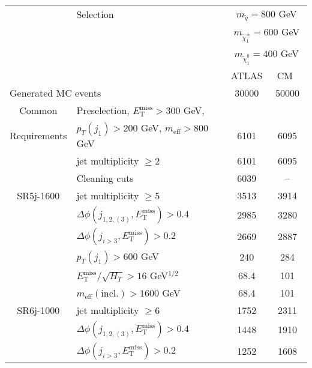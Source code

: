 \documentclass[10pt,fleqn]{article}
\newcommand{\met}{E^\mathrm{miss}_\mathrm{T}}
\newcommand{\meff}{m_\mathrm{eff}}
\begin{document}
\thispagestyle{empty}
\begin{table}[H] \centering
 \renewcommand*{\arraystretch}{1.}
 \begin{tabular}{c|l|c|c} \toprule
      & Selection & \multicolumn{2}{c}{$m_{\tilde{q}} = 800$ GeV}       \\ 
      &           & \multicolumn{2}{c}{$m_{\tilde{\chi}^\pm_1} = 600$ GeV}    \\      
      &           & \multicolumn{2}{c}{$m_{\tilde{\chi}^0_1} = 400$ GeV}   \\ \midrule
      &           & ATLAS             &  ~CM~~                         \\ \midrule
\multicolumn{2}{l|}{Generated MC events}                       &   30000    &   50000        \\ \midrule   
Common       & Preselection, $\met > 300$ GeV,                 &            &                \\ 
Requirements & $p_T(j_1) > 200$ GeV, $\meff > 800$ GeV         &     6101   &   6095         \\
             & jet multiplicity $\geq 2$                       &     6101   &   6095         \\
             & Cleaning cuts                                   &     6039   &   --           \\ \midrule      
SR5j-1600    & jet multiplicity $\geq 5$                       &     3513   &   3914         \\
             & $\Delta\phi(j_{1,2,(3)},\met) > 0.4$            &     2985   &   3280          \\
             & $\Delta\phi(j_{i>3},\met) > 0.2$                &     2669   &   2887          \\      
             & $p_T(j_1) > 600$ GeV                            &      240   &   284         \\           
             & $\met/\sqrt{H_T} > 16$ GeV$^{1/2}$              &     68.4   &   101         \\    
             & $\meff(\mathrm{incl.}) > 1600$ GeV              &     68.4   &   101         \\ \midrule       
SR6j-1000    & jet multiplicity $\geq 6$                       &     1752   &   2311          \\
             & $\Delta\phi(j_{1,2,(3)},\met) > 0.4$            &     1448   &   1910          \\
             & $\Delta\phi(j_{i>3},\met) > 0.2$                &     1252   &   1608         \\      

\end{tabular}
\end{table}
\end{document}
